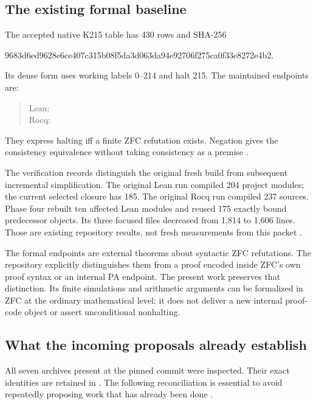 \subsection{The existing formal baseline}

The accepted native K215 table has 430 rows and SHA-256
\begin{center}\small\ttfamily
9683d6ed9628e6ce407c315b08f5da3d063da94e92706f275ca0f33e8272e4b2.
\end{center}
Its dense form uses working labels 0--214 and halt 215. The maintained
endpoints are:
\begin{quote}\small
Lean: \\
Rocq: 
\end{quote}
They express halting iff a finite ZFC refutation exists. Negation gives the
consistency equivalence without taking consistency as a premise
\cite{primary,verification}.

The verification records distinguish the original fresh build from subsequent
incremental simplification. The original Lean run compiled 204 project modules;
the current selected closure has 185. The original Rocq run compiled 237
sources. Phase four rebuilt ten affected Lean modules and reused 175 exactly
bound predecessor objects. Its three focused files decreased from 1,814 to
1,606 lines. Those are existing repository results, not fresh measurements
from this packet \cite{phase4}.

The formal endpoints are external theorems about syntactic ZFC refutations.
The repository explicitly distinguishes them from a proof encoded inside
ZFC's own proof syntax or an internal PA endpoint. The present work preserves
that distinction. Its finite simulations and arithmetic arguments can be
formalized in ZFC at the ordinary mathematical level; it does not deliver a
new internal proof-code object or assert unconditional nonhalting.

\subsection{What the incoming proposals already establish}

All seven archives present at the pinned commit were inspected. Their exact
identities are retained in .
The following reconciliation is essential to avoid repeatedly proposing
work that has already been done \cite{incoming}.

